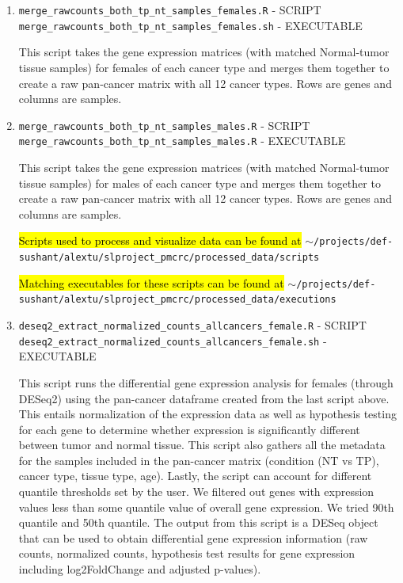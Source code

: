 \documentclass[10pt]{article}
\begin{document}
\begin{enumerate}
\item\texttt{merge\_rawcounts\_both\_tp\_nt\_samples\_females.R} - SCRIPT \newline
\texttt{merge\_rawcounts\_both\_tp\_nt\_samples\_females.sh} - EXECUTABLE

This script takes the gene expression matrices (with matched Normal-tumor tissue samples) for females of each cancer type and merges them together to create a raw pan-cancer matrix with all 12 cancer types. Rows are genes and columns are samples.

\item\texttt{merge\_rawcounts\_both\_tp\_nt\_samples\_males.R} - SCRIPT \newline
\texttt{merge\_rawcounts\_both\_tp\_nt\_samples\_males.R} - EXECUTABLE

This script takes the gene expression matrices (with matched Normal-tumor tissue samples) for males of each cancer type and merges them together to create a raw pan-cancer matrix with all 12 cancer types. Rows are genes and columns are samples.

\hl{Scripts used to process and visualize data can be found at} \texttt{$\sim$/projects/def-sushant/alextu/\newline slproject\_pmcrc/processed\_data/scripts}

\hl{Matching executables for these scripts can be found at}
\texttt{$\sim$/projects/def-sushant/alextu/\newline slproject\_pmcrc/processed\_data/executions}


\item\texttt{deseq2\_extract\_normalized\_counts\_allcancers\_female.R} - SCRIPT\newline
\texttt{deseq2\_extract\_normalized\_counts\_allcancers\_female.sh} - EXECUTABLE
	
This script runs the differential gene expression analysis for females (through DESeq2) using the pan-cancer dataframe created from the last script above. This entails normalization of the expression data as well as hypothesis testing for each gene to determine whether expression is significantly different between tumor and normal tissue. This script also gathers all the metadata for the samples included in the pan-cancer matrix (condition (NT vs TP), cancer type, tissue type, age). Lastly, the script can account for different quantile thresholds set by the user. We filtered out genes with expression values less than some quantile value of overall gene expression. We tried 90th quantile and 50th quantile. The output from this script is a DESeq object that can be used to obtain differential gene expression information (raw counts, normalized counts, hypothesis test results for gene expression including log2FoldChange and adjusted p-values).
	

\end{enumerate}
\end{document}
